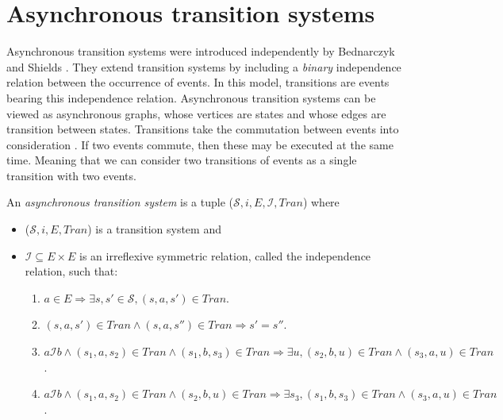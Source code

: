 \section{Asynchronous transition systems}
\label{sec:asynchronous-transition-systems}

    Asynchronous transition systems were introduced independently by Bednarczyk \cite{bed88CategoriesAsynchSystems} and Shields \cite{Shields84}. They extend transition systems by including a \emph{binary} independence relation between the occurrence of events. In this model, transitions are events bearing this independence relation. Asynchronous transition systems can be viewed as asynchronous graphs, whose vertices are states and whose edges are transition between states. Transitions take the commutation between events into consideration \cite[Section 3.3]{Fajstrup16DirectedAlgebraicTopologyConcurrency}. If two events commute, then these may be executed at the same time. Meaning that we can consider two transitions of events as a single transition with two events.
    
    \begin{definition}\label{def:asynchronous-transition-system}
        An \emph{asynchronous transition system} is a tuple ($\mathcal{S},i,E,\mathcal{I},Tran$) where
        \begin{itemize}
            \item ($\mathcal{S},i,E,Tran$) is a transition system and
            \item $\mathcal{I} \subseteq E \times E$ is an irreflexive symmetric relation, called the independence relation, such that:
            
            \begin{enumerate}
                \item $a \in E \Rightarrow \exists s, s' \in \mathcal{S}, (s,a,s') \in Tran$.
                \item $(s,a,s') \in Tran \wedge (s,a,s'') \in Tran \Rightarrow s' = s''$.
                \item $a\mathcal{I}b \wedge (s_{1},a,s_{2}) \in Tran \wedge (s_{1}, b, s_{3}) \in Tran \Rightarrow \exists u, (s_{2},b,u) \in Tran \wedge (s_{3},a,u) \in Tran$.
                \item $a\mathcal{I}b \wedge (s_{1},a,s_{2}) \in Tran \wedge (s_{2}, b, u) \in Tran \Rightarrow \exists s_{3}, (s_{1},b,s_{3}) \in Tran \wedge (s_{3},a,u) \in Tran$.
            \end{enumerate}
        \end{itemize}
    \end{definition}
    
